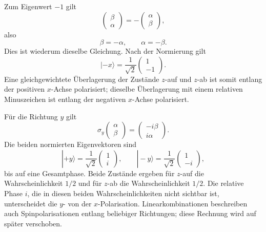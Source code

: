 Zum Eigenwert \(-1\) gilt
\begin{equation}
\begin{pmatrix}
\beta\\
\alpha
\end{pmatrix}
=
-
\begin{pmatrix}
\alpha\\
\beta
\end{pmatrix},
\end{equation}
also
\begin{equation}
\beta=-\alpha,
\qquad
\alpha=-\beta.
\end{equation}
Dies ist wiederum dieselbe Gleichung. Nach der Normierung gilt
\begin{equation}
|-x\rangle
=
\frac{1}{\sqrt2}
\begin{pmatrix}
1\\
-1
\end{pmatrix}.
\end{equation}
Eine gleichgewichtete Überlagerung der Zustände \(z\)-auf und \(z\)-ab ist somit entlang der positiven \(x\)-Achse polarisiert; dieselbe Überlagerung mit einem relativen Minuszeichen ist entlang der negativen \(x\)-Achse polarisiert.

Für die Richtung \(y\) gilt
\begin{equation}
\sigma_y
\begin{pmatrix}
\alpha\\
\beta
\end{pmatrix}
=
\begin{pmatrix}
-i\beta\\
i\alpha
\end{pmatrix}.
\end{equation}
Die beiden normierten Eigenvektoren sind
\begin{equation}
|+y\rangle
=
\frac{1}{\sqrt2}
\begin{pmatrix}
1\\
i
\end{pmatrix},
\qquad
|-y\rangle
=
\frac{1}{\sqrt2}
\begin{pmatrix}
1\\
-i
\end{pmatrix},
\end{equation}
bis auf eine Gesamtphase. Beide Zustände ergeben für \(z\)-auf die Wahrscheinlichkeit \(1/2\) und für \(z\)-ab die Wahrscheinlichkeit \(1/2\). Die relative Phase \(i\), die in diesen beiden Wahrscheinlichkeiten nicht sichtbar ist, unterscheidet die \(y\)- von der \(x\)-Polarisation. Linearkombinationen beschreiben auch Spinpolarisationen entlang beliebiger Richtungen; diese Rechnung wird auf später verschoben.

